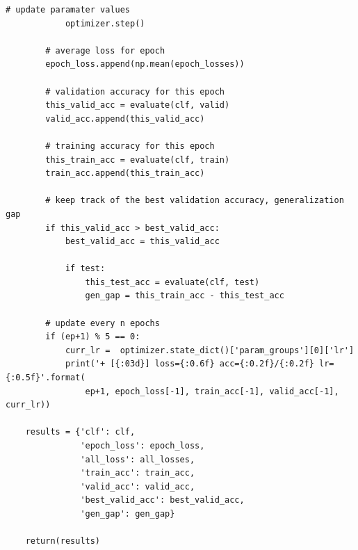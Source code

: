 \documentclass{amsart}
\theoremstyle{definition}
\theoremstyle{remark}
\numberwithin{equation}{section}
\begin{document}
\begin{lstlisting}[breaklines]
            # update paramater values
            optimizer.step()

        # average loss for epoch
        epoch_loss.append(np.mean(epoch_losses))

        # validation accuracy for this epoch
        this_valid_acc = evaluate(clf, valid)
        valid_acc.append(this_valid_acc)

        # training accuracy for this epoch
        this_train_acc = evaluate(clf, train)
        train_acc.append(this_train_acc)

        # keep track of the best validation accuracy, generalization gap
        if this_valid_acc > best_valid_acc:
            best_valid_acc = this_valid_acc

            if test:
                this_test_acc = evaluate(clf, test)
                gen_gap = this_train_acc - this_test_acc

        # update every n epochs
        if (ep+1) % 5 == 0:
            curr_lr =  optimizer.state_dict()['param_groups'][0]['lr']
            print('+ [{:03d}] loss={:0.6f} acc={:0.2f}/{:0.2f} lr={:0.5f}'.format(
                ep+1, epoch_loss[-1], train_acc[-1], valid_acc[-1], curr_lr))

    results = {'clf': clf,
               'epoch_loss': epoch_loss,
               'all_loss': all_losses,
               'train_acc': train_acc,
               'valid_acc': valid_acc,
               'best_valid_acc': best_valid_acc,
               'gen_gap': gen_gap}

    return(results)

\end{lstlisting}
\end{document}
